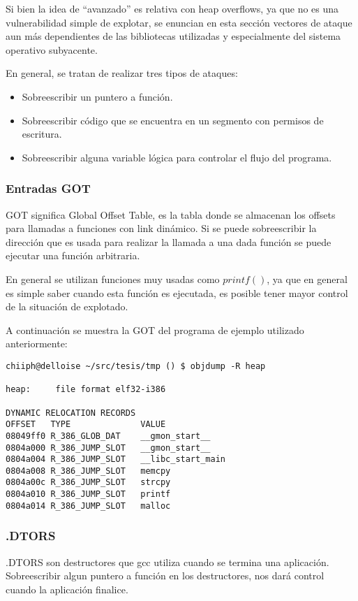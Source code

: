 	Si bien la idea de ``avanzado'' es relativa con heap overflows, ya que no es una vulnerabilidad simple de explotar, se enuncian en esta secci\'on vectores de ataque aun m\'as dependientes de las bibliotecas utilizadas y especialmente del sistema operativo subyacente.
	
	En general, se tratan de realizar tres tipos de ataques:
	
	\begin{itemize}
	\item Sobreescribir un puntero a funci\'on.
	\item Sobreescribir c\'odigo que se encuentra en un segmento con permisos de escritura.
	\item Sobreescribir alguna variable l\'ogica para controlar el flujo del programa.
	\end{itemize}
	
	\subsubsection{Entradas GOT}
	
	GOT significa Global Offset Table, es la tabla donde se almacenan los offsets para llamadas a funciones con link din\'amico. Si se puede sobreescribir la direcci\'on que es usada para realizar la llamada a una dada funci\'on se puede ejecutar una funci\'on arbitraria.
	
	En general se utilizan funciones muy usadas como $printf()$, ya que en general es simple saber cuando esta funci\'on es ejecutada, es posible tener mayor control de la situaci\'on de explotado.
	
	A continuaci\'on se muestra la GOT del programa de ejemplo utilizado anteriormente:
	
	\vspace{5 mm}
	
	\begin{lstlisting}
chiiph@delloise ~/src/tesis/tmp () $ objdump -R heap

heap:     file format elf32-i386

DYNAMIC RELOCATION RECORDS
OFFSET   TYPE              VALUE 
08049ff0 R_386_GLOB_DAT    __gmon_start__
0804a000 R_386_JUMP_SLOT   __gmon_start__
0804a004 R_386_JUMP_SLOT   __libc_start_main
0804a008 R_386_JUMP_SLOT   memcpy
0804a00c R_386_JUMP_SLOT   strcpy
0804a010 R_386_JUMP_SLOT   printf
0804a014 R_386_JUMP_SLOT   malloc
	\end{lstlisting}

	\vspace{5 mm}
	
	\subsubsection{.DTORS}
	
	.DTORS son destructores que gcc utiliza cuando se termina una aplicaci\'on. Sobreescribir algun puntero a funci\'on en los destructores, nos dar\'a control cuando la aplicaci\'on finalice.